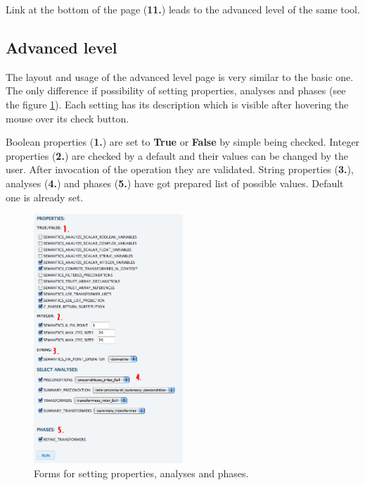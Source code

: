 Link at the bottom of the page ({\bf 11.}) leads to the advanced level of the same tool.

\subsection{Advanced level}

The layout and usage of the advanced level page is very similar to the basic one. The only difference if possibility of setting properties, analyses and phases (see the figure \ref{fig:advanced_properties}). Each setting has its description which is visible after hovering the mouse over its check button.

Boolean properties ({\bf 1.}) are set to {\bf True} or {\bf False} by simple being checked. Integer properties ({\bf 2.}) are checked by a default and their values can be changed by the user. After invocation of the operation they are validated. String properties ({\bf 3.}), analyses ({\bf 4.}) and phases ({\bf 5.}) have got prepared list of possible values. Default one is already set.

\begin{figure}[h!]
  \centering
  \includegraphics[width=0.5\textwidth]{reportCh4/advanced_properties}
  \caption{Forms for setting properties, analyses and phases.}
  \label{fig:advanced_properties}
\end{figure}